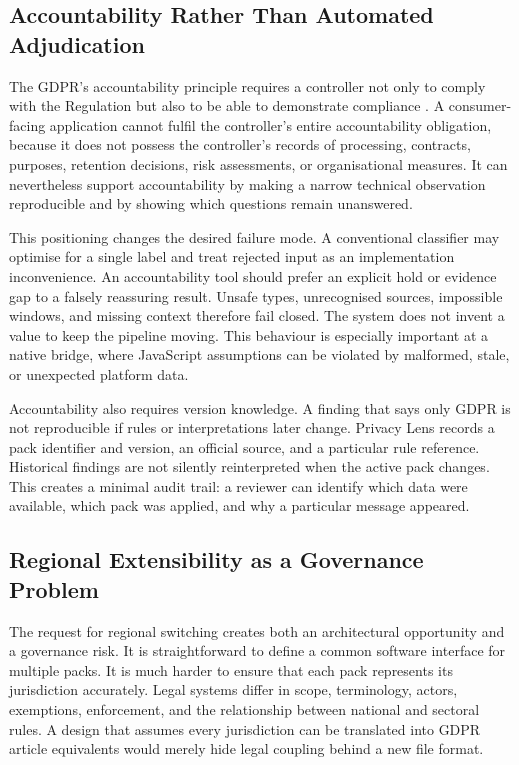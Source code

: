 \subsection{Accountability Rather Than Automated Adjudication}

The GDPR's accountability principle requires a controller not only to comply with the Regulation but also to be able to demonstrate compliance \cite{eurlex2016}. A consumer-facing application cannot fulfil the controller's entire accountability obligation, because it does not possess the controller's records of processing, contracts, purposes, retention decisions, risk assessments, or organisational measures. It can nevertheless support accountability by making a narrow technical observation reproducible and by showing which questions remain unanswered.

This positioning changes the desired failure mode. A conventional classifier may optimise for a single label and treat rejected input as an implementation inconvenience. An accountability tool should prefer an explicit hold or evidence gap to a falsely reassuring result. Unsafe types, unrecognised sources, impossible windows, and missing context therefore fail closed. The system does not invent a value to keep the pipeline moving. This behaviour is especially important at a native bridge, where JavaScript assumptions can be violated by malformed, stale, or unexpected platform data.

Accountability also requires version knowledge. A finding that says only GDPR is not reproducible if rules or interpretations later change. Privacy Lens records a pack identifier and version, an official source, and a particular rule reference. Historical findings are not silently reinterpreted when the active pack changes. This creates a minimal audit trail: a reviewer can identify which data were available, which pack was applied, and why a particular message appeared.

\subsection{Regional Extensibility as a Governance Problem}

The request for regional switching creates both an architectural opportunity and a governance risk. It is straightforward to define a common software interface for multiple packs. It is much harder to ensure that each pack represents its jurisdiction accurately. Legal systems differ in scope, terminology, actors, exemptions, enforcement, and the relationship between national and sectoral rules. A design that assumes every jurisdiction can be translated into GDPR article equivalents would merely hide legal coupling behind a new file format.


